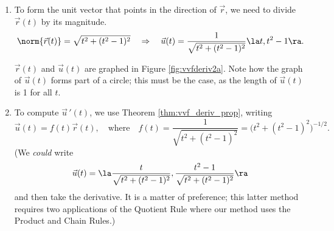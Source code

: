 {\begin{enumerate}
	\item To form the unit vector that points in the direction of $\vec r$, we need to divide $\vec r(t)$ by its magnitude. 
	$$\norm{\vec r(t)} = \sqrt{t^2+(t^2-1)^2} \quad \Rightarrow \quad \vec u(t) = \frac{1}{\sqrt{t^2+(t^2-1)^2}}\la t,t^2-1\ra.$$
	
	$\vec r(t)$ and $\vec u(t)$ are graphed in Figure \ref{fig:vvfderiv2a}. Note how the graph of $\vec u(t)$ forms part of a circle; this must be the case, as the length of $\vec u(t)$ is 1 for all $t$.
	\drawexampleline
	
	\item		To compute $\vec u\,'(t)$, we use Theorem \ref{thm:vvf_deriv_prop}, writing $$\vec u(t) = f(t)\vec r(t),\quad  \text{where}\quad f(t) = \frac{1}{\sqrt{t^2+(t^2-1)^2}}=\big(t^2+(t^2-1)^2\big)^{-1/2}.$$ (We \emph{could} write $$\vec u(t) = \la \frac{t}{\sqrt{t^2+(t^2-1)^2}}, \frac{t^2-1}{\sqrt{t^2+(t^2-1)^2}}\ra$$ and then take the derivative. It is a matter of preference; this latter method requires two applications of the Quotient Rule where our method uses the Product and Chain Rules.)
	

\end{enumerate}}
